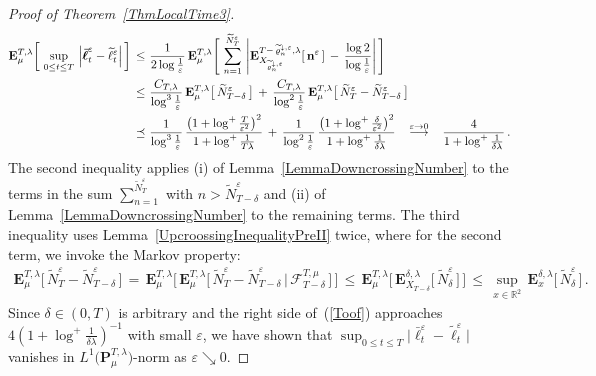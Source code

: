 \documentclass[10pt]{article}
\def\stackrel#1#2{\mathrel{\mathop{#2}\limits^{#1}}}
\numberwithin{equation}{section}
\theoremstyle{definition}
\newcommand{\R}{{\mathbb R}}
\begin{document}
\begin{proof}[Proof of Theorem~\ref{ThmLocalTime3}]
\begin{align}
 \mathbf{E}^{T,\lambda}_{\mu}\bigg[ \,\sup_{0\leq t\leq T}\,\Big| \boldsymbol{\bar{\ell}}_t^{\varepsilon} -\widetilde{\ell}_t^{\varepsilon} \Big|\,\bigg]   \,\leq \,&\,\frac{1}{2\log \frac{1}{\varepsilon} }\,\mathbf{E}^{T,\lambda}_{\mu}\Bigg[\,\sum_{n=1}^{\widetilde{N}_T^{\varepsilon}}\, \Bigg|\mathbf{E}^{T-\,\widetilde{\varrho}_{n}^{\downarrow,\varepsilon},\lambda}_{X_{\widetilde{\varrho}_{n}^{\downarrow,\varepsilon}}}[ \,\mathbf{n}^{\varepsilon}\,]\,-\,\frac{\log 2}{\log \frac{1}{\varepsilon}  }\Bigg|\, \Bigg] \nonumber \\  \,\leq \,&\,\frac{C_{T,\lambda}}{\log^3 \frac{1}{\varepsilon} }\,\mathbf{E}^{T,\lambda}_{\mu}\big[\,\widetilde{N}_{T-\delta}^{\varepsilon} \,\big] \,+\, \frac{C_{T,\lambda} }{\log^2 \frac{1}{\varepsilon}  }\,\mathbf{E}^{T,\lambda}_{\mu}\big[\,\widetilde{N}_{T}^{\varepsilon}-\widetilde{N}_{T-\delta}^{\varepsilon} \,\big] \nonumber  \\  \,\preceq\,&\,\frac{1 }{\log^3 \frac{1}{\varepsilon} }\,\frac{ \big(1+\log^+\frac{T}{\varepsilon^2}\big)^2 }{1+\log^+\frac{1}{T\lambda} } \,+\, \frac{1 }{\log^2 \frac{1}{\varepsilon}  }\,\frac{ \big(1+\log^+\frac{\delta}{\varepsilon^2}\big)^2 }{1+\log^+\frac{1}{\delta\lambda} } \hspace{.3cm}\stackrel{\varepsilon\rightarrow 0}{\longrightarrow} \hspace{.3cm}\frac{4}{1+\log^+\frac{1}{\delta\lambda} }\,. 
\end{align}
The second inequality applies (i) of Lemma~\ref{LemmaDowncrossingNumber} to the terms in the sum $\sum_{n=1}^{\widetilde{N}_T^{\varepsilon}}$ with $n>\widetilde{N}_{T-\delta}^{\varepsilon}$ and (ii) of Lemma~\ref{LemmaDowncrossingNumber} to the remaining terms.  The third inequality uses Lemma~\ref{UpcroossingInequalityPreII} twice, where for the second term, we invoke the Markov property:
\begin{align*}
\mathbf{E}^{T,\lambda}_{\mu}\big[\,\widetilde{N}_{T}^{\varepsilon}-\widetilde{N}_{T-\delta}^{\varepsilon}\, \big] \,=\, \mathbf{E}^{T,\lambda}_{\mu}\Big[\,\mathbf{E}^{T,\lambda}_{\mu}\big[\, \widetilde{N}_{T}^{\varepsilon}-\widetilde{N}_{T-\delta}^{\varepsilon}\,\big|\, \mathscr{F}_{T-\delta}^{T,\mu} \,\big]\,\Big]\,\leq  \,\mathbf{E}^{T,\lambda}_{\mu}\Big[\,\mathbf{E}^{\delta,\lambda}_{X_{T-\delta}}\big[\, \widetilde{N}_{\delta}^{\varepsilon}\,\big]\,\Big] \,\leq \,\sup_{x\in \R^2}  \,\mathbf{E}^{\delta,\lambda}_{x}\big[\, \widetilde{N}_{\delta}^{\varepsilon}\,\big]\,.\nonumber 
\end{align*}
Since $\delta\in (0,T)$ is arbitrary and the right side of~(\ref{Toof}) approaches $ 4(1+\log^+\frac{1}{\delta\lambda})^{-1}$ with small $\varepsilon$, we have shown that  $\sup_{0\leq t\leq T}\big|  \boldsymbol{\bar{\ell}}_t^{\varepsilon}-\widetilde{\ell}_t^{\varepsilon}\big| $
vanishes in $L^1\big(\mathbf{P}^{T,\lambda}_{\mu}\big)$-norm  as $\varepsilon\searrow 0$. 
 


\end{proof}
\end{document}
